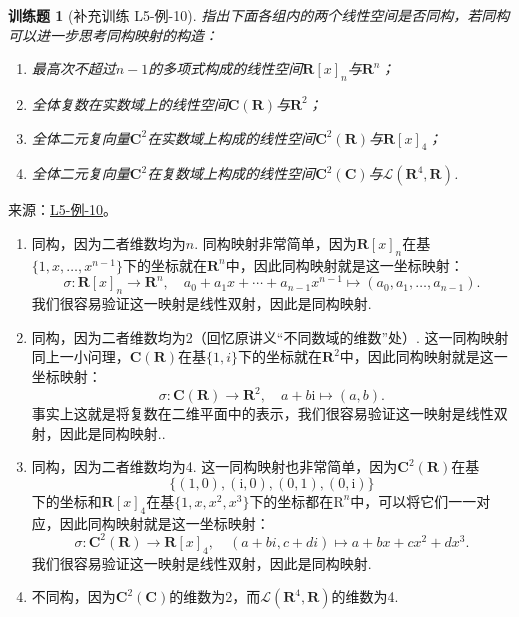 \documentclass[UTF8,12pt,a4paper,fontset=fandol]{ctexart}
\newtheorem{exercise}{训练题}[section]
\begin{document}
\begin{exercise}[补充训练 L5-例-10]\label{prob:L5-例-10}
指出下面各组内的两个线性空间是否同构，若同构可以进一步思考同构映射的构造：
    \begin{enumerate}
        \item 最高次不超过$n-1$的多项式构成的线性空间$\mathbf{R}[x]_n$与$\mathbf{R}^n$；

        \item 全体复数在实数域上的线性空间$\mathbf{C}(\mathbf{R})$与$\mathbf{R}^2$；

        \item 全体二元复向量$\mathbf{C}^2$在实数域上构成的线性空间$\mathbf{C}^2(\mathbf{R})$与$\mathbf{R}[x]_4$；

        \item 全体二元复向量$\mathbf{C}^2$在复数域上构成的线性空间$\mathbf{C}^2(\mathbf{C})$与$\mathcal{L}(\mathbf{R}^4,\mathbf{R})$.
    \end{enumerate}
\end{exercise}
\noindent 来源：\href{https://github.com/yhwu-is/Linear-Algebra-Left-Undone/blob/new/%E8%AE%B2%E4%B9%89/%E4%B8%93%E9%A2%98/5%20%E7%BA%BF%E6%80%A7%E6%98%A0%E5%B0%84.tex}{L5-例-10}。
\begin{solve}
\begin{enumerate}
        \item 同构，因为二者维数均为$n$. 同构映射非常简单，因为$\mathbf{R}[x]_n$在基$\{1,x,\ldots,x^{n-1}\}$下的坐标就在$\mathbf{R}^n$中，因此同构映射就是这一坐标映射：
              \[\sigma:\mathbf{R}[x]_n\to\mathbf{R}^n,\quad a_0+a_1x+\cdots+a_{n-1}x^{n-1}\mapsto(a_0,a_1,\ldots,a_{n-1}).\]
              我们很容易验证这一映射是线性双射，因此是同构映射.

        \item 同构，因为二者维数均为2（回忆原讲义“不同数域的维数”处）. 这一同构映射同上一小问理，$\mathbf{C}(\mathbf{R})$在基$\{1,i\}$下的坐标就在$\mathbf{R}^2$中，因此同构映射就是这一坐标映射：
              \[\sigma:\mathbf{C}(\mathbf{R})\to\mathbf{R}^2,\quad a+b\mathrm{i}\mapsto(a,b).\]
              事实上这就是将复数在二维平面中的表示，我们很容易验证这一映射是线性双射，因此是同构映射..

        \item 同构，因为二者维数均为4. 这一同构映射也非常简单，因为$\mathbf{C}^2(\mathbf{R})$在基
              \[\{(1,0),(\mathrm{i},0),(0,1),(0,\mathrm{i})\}\]
              下的坐标和$\mathbf{R}[x]_4$在基$\{1,x,x^2,x^3\}$下的坐标都在$\mathrm{R}^n$中，可以将它们一一对应，因此同构映射就是这一坐标映射：
              \[\sigma:\mathbf{C}^2(\mathbf{R})\to\mathbf{R}[x]_4,\quad (a+bi,c+di)\mapsto a+bx+cx^2+dx^3.\]
              我们很容易验证这一映射是线性双射，因此是同构映射.

        \item 不同构，因为$\mathbf{C}^2(\mathbf{C})$的维数为2，而$\mathcal{L}(\mathbf{R}^4,\mathbf{R})$的维数为4.
    \end{enumerate}
\end{solve}
\end{document}

